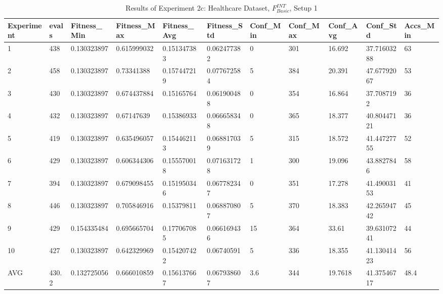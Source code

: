 		\begin{table}[H]
			\caption{Results of Experiment 2c: Healthcare Dataset, $F_{Basic}^{INT}$, Setup 1}
			\label{tab:A_Exp2c_Data}
			\begin{adjustbox}{max width=380pt,keepaspectratio,angle=90}
				\begin{tabular}{|l|l|l|l|l|l|l|l|l|l|l|}
					\rowcolor[HTML]{EFEFEF} 
					\hline
					Experiment & evals & Fitness\_Min & Fitness\_Max & Fitness\_Avg & Fitness\_Std & Conf\_Min & Conf\_Max & Conf\_Avg & Conf\_Std   & Accs\_Min \\ \hline
					1          & 438   & 0.130323897  & 0.615999032  & 0.151347383  & 0.062477382  & 0         & 301       & 16.692    & 37.71603288 & 63        \\ \hline
					2          & 458   & 0.130323897  & 0.73341388   & 0.157447219  & 0.077672584  & 5         & 384       & 20.391    & 47.67792067 & 53        \\ \hline
					3          & 430   & 0.130323897  & 0.674437884  & 0.15165764   & 0.061900488  & 0         & 354       & 16.864    & 37.7087192  & 36        \\ \hline
					4          & 432   & 0.130323897  & 0.67147639   & 0.15386933   & 0.066658348  & 0         & 365       & 18.377    & 40.80447121 & 36        \\ \hline
					5          & 419   & 0.130323897  & 0.635496057  & 0.154462113  & 0.068817039  & 5         & 315       & 18.572    & 41.44727755 & 52        \\ \hline
					6          & 429   & 0.130323897  & 0.606344306  & 0.155570018  & 0.071631728  & 1         & 300       & 19.096    & 43.8827846  & 58        \\ \hline
					7          & 394   & 0.130323897  & 0.679098455  & 0.151950346  & 0.067782347  & 0         & 351       & 17.278    & 41.49003153 & 41        \\ \hline
					8          & 446   & 0.130323897  & 0.705846916  & 0.15379811   & 0.068870807  & 5         & 370       & 18.383    & 42.26594742 & 45        \\ \hline
					9          & 429   & 0.154335484  & 0.695665704  & 0.177067085  & 0.066169436  & 15        & 364       & 33.61     & 39.63107241 & 44        \\ \hline
					10         & 427   & 0.130323897  & 0.642329969  & 0.154207422  & 0.06740591   & 5         & 336       & 18.355    & 41.13041423 & 56        \\ \hline\hline
					AVG        & 430.2 & 0.132725056  & 0.666010859  & 0.156137667  & 0.067938607  & 3.6       & 344       & 19.7618   & 41.37546717 & 48.4      \\ \hline

\end{tabular}
\end{adjustbox}
\end{table}
